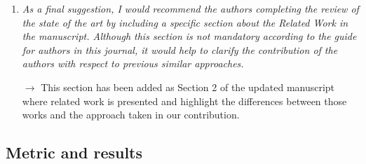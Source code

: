 \documentclass[10pt]{article}
\begin{document}
\begin{enumerate}
\item \emph{As a final suggestion, I would recommend the authors completing the review of the state of the art by including a specific section about the Related Work in the manuscript. Although this section is not mandatory according to the guide for authors in this journal, it would help to clarify the contribution of the authors with respect to previous similar approaches.}

$\rightarrow$ This section has been added as Section 2 of the updated manuscript where related work is presented and highlight the differences between those works and the approach taken in our contribution.

\end{enumerate}

\subsection{Metric and results}
\end{document}
